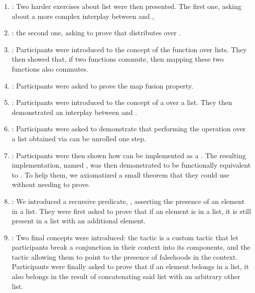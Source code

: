 \begin{enumerate}
  \item {}: Two harder exercises about list were then
presented.  The first one, asking about a more complex interplay between
 and ,

  \item {}: the second one, asking to prove
that  distributes over .

  \item {}: Participants were introduced to the concept of
the function  over lists.  They then showed that, if two
functions commute, then mapping these two functions also commutes.

  \item {}: Participants were asked to prove the map fusion
property.

  \item {}: Participants were introduced to the concept of a
 over a list.  They then demonstrated an interplay between
 and .

  \item {}: Participants were asked to demonstrate that
performing the operation  over a list obtained via
 can be unrolled one step.

  \item {}: Participants were then shown how 
can be implemented as a .  The resulting implementation, named
, was then demonstrated to be functionally equivalent to
.  To help them, we axiomatized a small theorem that they could
use without needing to prove.

  \item {}: We introduced a recursive predicate,
, asserting the presence of an element in a list.  They were first
asked to prove that if an element is in a list, it is still present in a list
with an additional element.

  \item {}: Two final concepts were introduced: the
 tactic is a custom tactic that let participants break a
conjunction in their context into its components, and the
 tactic allowing them to point to the presence of
falsehoods in the context.  Participants were finally asked to prove that if an
element belongs in a list, it also belongs in the result of concatenating said
list with an arbitrary other list.

\end{enumerate}

